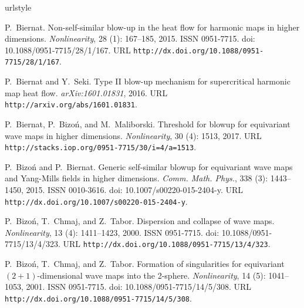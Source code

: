 \documentclass[11pt]{aims}
\theoremstyle{definition}
\numberwithin{equation}{section}
\begin{document}
\begin{thebibliography}{62}
\providecommand{\natexlab}[1]{#1}
\providecommand{\url}[1]{\texttt{#1}}
\expandafter\ifx\csname urlstyle\endcsname\relax
  \providecommand{\doi}[1]{doi: #1}\else
  \providecommand{\doi}{doi: \begingroup \urlstyle{rm}\Url}\fi

P.~Biernat.
\newblock Non-self-similar blow-up in the heat flow for harmonic maps in higher
  dimensions.
\newblock \emph{Nonlinearity}, 28 (1): 167--185, 2015.
\newblock ISSN 0951-7715.
\newblock \doi{10.1088/0951-7715/28/1/167}.
\newblock URL \url{http://dx.doi.org/10.1088/0951-7715/28/1/167}.

P.~Biernat and Y.~Seki.
\newblock Type {II} blow-up mechanism for supercritical harmonic map heat flow.
\newblock \emph{arXiv:1601.01831}, 2016.
\newblock URL \url{http://arxiv.org/abs/1601.01831}.

P.~Biernat, P.~Bizo{\'n}, and M.~Maliborski.
\newblock Threshold for blowup for equivariant wave maps in higher dimensions.
\newblock \emph{Nonlinearity}, 30 (4): 1513, 2017.
\newblock URL \url{http://stacks.iop.org/0951-7715/30/i=4/a=1513}.

P.~Bizo\'n and P.~Biernat.
\newblock Generic self-similar blowup for equivariant wave maps and
  {Y}ang-{M}ills fields in higher dimensions.
\newblock \emph{Comm. Math. Phys.}, 338 (3): 1443--1450,
  2015.
\newblock ISSN 0010-3616.
\newblock \doi{10.1007/s00220-015-2404-y}.
\newblock URL \url{http://dx.doi.org/10.1007/s00220-015-2404-y}.

P.~Bizo\'n, T.~Chmaj, and Z.~Tabor.
\newblock Dispersion and collapse of wave maps.
\newblock \emph{Nonlinearity}, 13 (4): 1411--1423, 2000.
\newblock ISSN 0951-7715.
\newblock \doi{10.1088/0951-7715/13/4/323}.
\newblock URL \url{http://dx.doi.org/10.1088/0951-7715/13/4/323}.

P.~Bizo\'n, T.~Chmaj, and Z.~Tabor.
\newblock Formation of singularities for equivariant {$(2+1)$}-dimensional wave
  maps into the 2-sphere.
\newblock \emph{Nonlinearity}, 14 (5): 1041--1053, 2001.
\newblock ISSN 0951-7715.
\newblock \doi{10.1088/0951-7715/14/5/308}.
\newblock URL \url{http://dx.doi.org/10.1088/0951-7715/14/5/308}.


\end{thebibliography}
\end{document}
